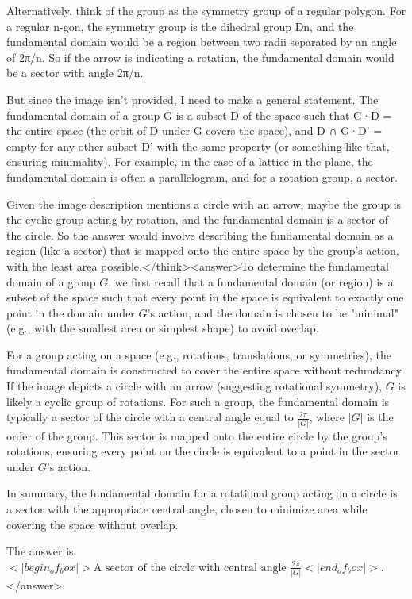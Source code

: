 Alternatively, think of the group as the symmetry group of a regular polygon. For a regular n-gon, the symmetry group is the dihedral group Dn, and the fundamental domain would be a region between two radii separated by an angle of 2π/n. So if the arrow is indicating a rotation, the fundamental domain would be a sector with angle 2π/n.

But since the image isn't provided, I need to make a general statement. The fundamental domain of a group G is a subset D of the space such that G·D = the entire space (the orbit of D under G covers the space), and D ∩ G·D' = empty for any other subset D' with the same property (or something like that, ensuring minimality). For example, in the case of a lattice in the plane, the fundamental domain is often a parallelogram, and for a rotation group, a sector.

Given the image description mentions a circle with an arrow, maybe the group is the cyclic group acting by rotation, and the fundamental domain is a sector of the circle. So the answer would involve describing the fundamental domain as a region (like a sector) that is mapped onto the entire space by the group's action, with the least area possible.</think><answer>To determine the fundamental domain of a group \( G \), we first recall that a fundamental domain (or region) is a subset of the space such that every point in the space is equivalent to exactly one point in the domain under \( G \)'s action, and the domain is chosen to be "minimal" (e.g., with the smallest area or simplest shape) to avoid overlap.  

For a group acting on a space (e.g., rotations, translations, or symmetries), the fundamental domain is constructed to cover the entire space without redundancy. If the image depicts a circle with an arrow (suggesting rotational symmetry), \( G \) is likely a cyclic group of rotations. For such a group, the fundamental domain is typically a sector of the circle with a central angle equal to \( \frac{2\pi}{|G|} \), where \( |G| \) is the order of the group. This sector is mapped onto the entire circle by the group's rotations, ensuring every point on the circle is equivalent to a point in the sector under \( G \)'s action.  

In summary, the fundamental domain for a rotational group acting on a circle is a sector with the appropriate central angle, chosen to minimize area while covering the space without overlap.  

The answer is \(<|begin_of_box|>\text{A sector of the circle with central angle } \frac{2\pi}{|G|}<|end_of_box|>\).</answer>